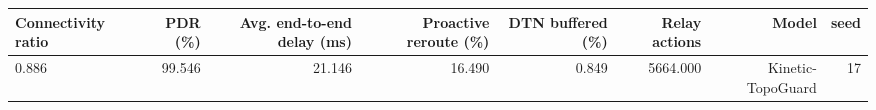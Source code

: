 \begin{tabular}{lrrrrrrr}
\toprule
Connectivity ratio & PDR (\%) & Avg. end-to-end delay (ms) & Proactive reroute (\%) & DTN buffered (\%) & Relay actions & Model & seed \\
\midrule
0.886 & 99.546 & 21.146 & 16.490 & 0.849 & 5664.000 & Kinetic-TopoGuard & 17 \\
\bottomrule
\end{tabular}